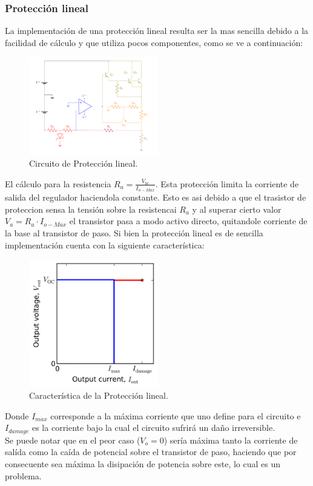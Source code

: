 \subsubsection{Protección lineal}
La implementación de una protección lineal resulta ser la mas sencilla debido a la facilidad de cálculo y que utiliza pocos componentes, como se ve a continuación:
\begin{figure}[H]
\centering
	\includegraphics[width=0.5\textwidth, page=3]{ImagenesEjercicio2/Regulador.pdf}
	\caption{Circuito de Protección lineal.}
	\label{fig:circuitolineal}
\end{figure}
El cálculo para la resistencia $R_a= \frac{V_{be}}{I_{o-Max}}$.
Esta protección limita la corriente de salida del regulador haciendola constante. Esto es asi debido a que el trasistor de proteccion sensa la tensión sobre la resistencai $R_a$ y al superar cierto valor $V_a = R_a \cdot I_{o-Max} $ el transistor pasa a modo activo directo, quitandole corriente de la base al transistor de paso.
Si bien la protección lineal es de sencilla implementación cuenta con la siguiente característica:
\begin{figure}[H]
\centering
	\includegraphics[width=0.5\textwidth]{ImagenesEjercicio2/Linearprotection.png}
	\caption{Característica de la Protección lineal.}
	\label{fig:circuitolinealcarac}
\end{figure}
Donde $I_{max}$ corresponde a la máxima corriente que uno define para el circuito e $I_{damage}$ es la corriente bajo la cual el circuito sufrirá un daño irreversible.\\
Se puede notar que en el  peor caso ($V_o = 0$) sería máxima tanto la corriente de salída como la caída de potencial sobre el transistor de paso, haciendo que por consecuente sea máxima la disipación de potencia sobre este, lo cual es un problema.
